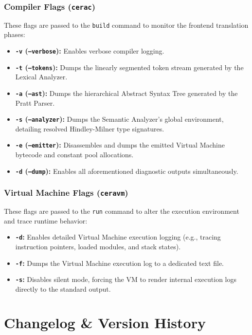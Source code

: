 \documentclass[11pt, a4paper]{article}
\begin{document}
\subsubsection*{Compiler Flags (\texttt{cerac})}
These flags are passed to the \texttt{build} command to monitor the frontend translation phases:
\begin{itemize}
    \item \textbf{\texttt{-v} (\texttt{--verbose}):} Enables verbose compiler logging.
    \item \textbf{\texttt{-t} (\texttt{--tokens}):} Dumps the linearly segmented token stream generated by the Lexical Analyzer.
    \item \textbf{\texttt{-a} (\texttt{--ast}):} Dumps the hierarchical Abstract Syntax Tree generated by the Pratt Parser.
    \item \textbf{\texttt{-s} (\texttt{--analyzer}):} Dumps the Semantic Analyzer's global environment, detailing resolved Hindley-Milner type signatures.
    \item \textbf{\texttt{-e} (\texttt{--emitter}):} Disassembles and dumps the emitted Virtual Machine bytecode and constant pool allocations.
    \item \textbf{\texttt{-d} (\texttt{--dump}):} Enables all aforementioned diagnostic outputs simultaneously.
\end{itemize}

\subsubsection*{Virtual Machine Flags (\texttt{ceravm})}
These flags are passed to the \texttt{run} command to alter the execution environment and trace runtime behavior:
\begin{itemize}
    \item \textbf{\texttt{-d}:} Enables detailed Virtual Machine execution logging (e.g., tracing instruction pointers, loaded modules, and stack states).
    \item \textbf{\texttt{-f}:} Dumps the Virtual Machine execution log to a dedicated text file.
    \item \textbf{\texttt{-s}:} Disables silent mode, forcing the VM to render internal execution logs directly to the standard output.
\end{itemize}

\section{Changelog \& Version History}
\end{document}
